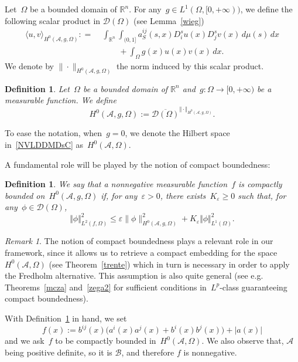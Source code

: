 \documentclass[11pt,hyp,]{nyjm}
\numberwithin{equation}{section}
\newcommand{\R}{\mathbb{R}}
\newtheorem{definition}[theorem]{Definition}
\theoremstyle{remark}
\newtheorem{remark}[theorem]{Remark}
\newcommand{\am}{\mathcal{A}}
\renewcommand{\leq}{\leqslant}
\renewcommand{\ge}{\geqslant}
\renewcommand{\epsilon}{\varepsilon}
\begin{document}
Let~$\Omega$ be a bounded domain of $\R^n$. For any~$g \in L^1(\Omega,[0,+\infty))$, we define the following scalar product in $\mathcal{D}(\Omega)$ (see Lemma~\ref{wieg})
           \begin{equation}\label{saojdcvn-435tyhnfwegbX}\begin{split}
           	\langle u, v \rangle_{H^0(\mathcal{A}, g, \Omega)} : =\;& \int_{\R^n}  \int_{(0,1]} a^{ij}_S(s,x) D_i^su (x)D^s_jv(x) \, d\mu(s) \, dx \\&\qquad+ \int_{\Omega} g(x) u(x) v(x) \, dx.\end{split}
           \end{equation}
We denote by $\|\cdot\|_{H^0(\mathcal{A}, g, \Omega)}$ the norm induced by this scalar product.

\begin{definition}\label{qeimsot}
Let~$\Omega$ be a bounded domain of $\R^n$ and~$g: \Omega \to [0, +\infty)$ be a measurable function. 
We define
\begin{equation}\label{NVLDDMDsC}
H^0(\mathcal{A}, g, \Omega) := \overline{ \mathcal{D}(\Omega) }^{\Vert \cdot \Vert_{H^0(\mathcal{A}, g, \Omega)}}.\end{equation}
\end{definition}

To ease the notation, when~$g=0$, we denote the Hilbert space in~\eqref{NVLDDMDsC}
as~$H^0(\mathcal{A}, \Omega)$.

A fundamental role will be played by the notion of compact boundedness:

\begin{definition}\label{qeimsot2}
We say that a nonnegative measurable function~$f$ is \textit{compactly bounded} on~$H^0(\am, g, \Omega )$ if, for any~$\epsilon>0$, there exists~$K_{\epsilon}\ge0$ such that, for any~$\phi \in \mathcal{D}(\Omega)$,
           \begin{equation}\label{ghhg}
           	\Vert \phi \Vert_{L^2(f, \Omega)}^2 \leq \epsilon \|\phi \|^2_{H^0(\am, g, \Omega )} + K_{\epsilon} \Vert \phi \Vert_{L^1(\Omega)}^2.
           \end{equation}
\end{definition}


\begin{remark}
The notion of compact boundedness plays a relevant role in our framework, since it allows us to retrieve a compact embedding for the space~$H^0(\am, \Omega)$ (see Theorem~\ref{trente}) which in turn is necessary in order to apply the Fredholm alternative. 
This assumption is also quite general (see e.g. Theorems~\ref{mcza} and~\ref{zega2}
for sufficient conditions in~$L^p$-class guaranteeing compact boundedness).
\end{remark}
With Definition~\ref{qeimsot2} in hand, we set
\begin{equation}\label{efe}
           f(x) := b^{ij}(x) \Big( a^i(x) a^j(x)+ b^i(x) b^j(x)\Big) + |a(x)|
\end{equation} 
and we ask~$f$ to be compactly bounded in~$H^0(\mathcal{A}, \Omega)$. We also observe that, $\mathcal{A}$ being positive definite, so it is $\mathcal{B}$, and therefore $f$ is nonnegative.
\end{document}
